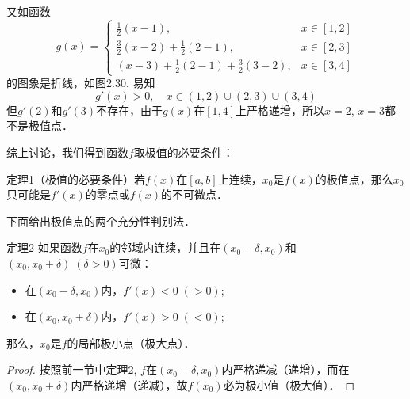 又如函数
\[g(x)=\begin{cases}
    \frac{1}{2}(x-1), & x\in[1,2]\\
    \frac{3}{2}(x-2)+ \frac{1}{2}(2-1), & x\in[2,3]\\
 (x-3) +\frac{1}{2}(2-1) + \frac{3}{2}(3-2), & x\in[3,4]
\end{cases}\]
的图象是折线，如图2.30, 易知
\[g' (x) > 0,\quad x\in (1, 2) \cup (2, 3) \cup (3, 4) \]
但$g'(2)$和$g'(3)$不存在，由于$g(x)$在$[1, 4]$上严格递增，所以$x=2$, $x=3$都不是极值点．

\begin{figure}[htp]
    \centering
{}
    \caption{}
\end{figure}

综上讨论，我们得到函数$f$取极值的必要条件：

\begin{blk}
    {定理1（极值的必要条件）}若$f(x)$在$[a,b]$上连续，$x_0$是$f(x)$的极值点，那么$x_0$只可能是$f'(x)$的零点或$f(x)$的不可微点．
\end{blk}

下面给出极值点的两个充分性判别法．

\begin{blk}
  {定理2} 如果函数$f$在$x_0$的邻域内连续，并且在$(x_0-\delta,x_0)$和$(x_0,x_0+\delta)\; (\delta>0)$可微：
\begin{itemize}
    \item 在$(x_0-\delta,x_0)$内，$f'(x)<0\; (>0)$;
    \item 在$(x_0,x_0+\delta)$内，$f'(x)>0\; (<0)$;
\end{itemize}
那么，$x_0$是$f$的局部极小点（极大点）．
\end{blk}

\begin{proof}
按照前一节中定理2, $f$在$(x_0-\delta,x_0)$内严格递减（递增），而在$(x_0,x_0+\delta)$内严格递增（递减），故$f(x_0)$必为极小值（极大值）．
\end{proof}

